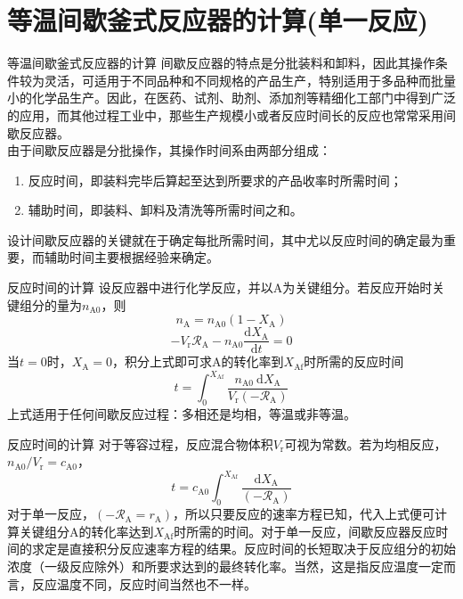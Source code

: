\section{等温间歇釜式反应器的计算(单一反应)}


\begin{frame}{等温间歇釜式反应器的计算}
    \qquad 间歇反应器的特点是分批装料和卸料，因此其操作条件较为灵活，可适用于不同品种和不同规格的产品生产，特别适用于多品种而批量小的化学品生产。因此，在医药、试剂、助剂、添加剂等精细化工部门中得到广泛的应用，而其他过程工业中，那些生产规模小或者反应时间长的反应也常常采用间歇反应器。
    \\\qquad 由于间歇反应器是分批操作，其操作时间系由两部分组成：
    \begin{enumerate}
      \item 反应时间，即装料完毕后算起至达到所要求的产品收率时所需时间；
      \item 辅助时间，即装料、卸料及清洗等所需时间之和。
    \end{enumerate}
    设计间歇反应器的关键就在于确定每批所需时间，其中尤以反应时间的确定最为重要，而辅助时间主要根据经验来确定。
\end{frame}


\begin{frame}{反应时间的计算}      
    设反应器中进行化学反应，并以A为关键组分。若反应开始时关键组分的量为$n_\mathrm{A0}$，则
    $$n_{\mathrm{A}}=n_{\mathrm{A} 0}(1-X_{\mathrm{A}})$$
    $$-V_{\mathrm{r}} \mathscr{R}_{\mathrm{A}}-n_{\mathrm{A} 0} \frac{\mathrm{d} X_{\mathrm{A}}}{\mathrm{d} t}=0$$        
    当$t=0$时，$X_\mathrm{A}=0$，积分上式即可求A的转化率到$X_\mathrm{Af}$时所需的反应时间
    $$t=\int_{0}^{X_{\mathrm{Af}}} \frac{n_{\mathrm{A} 0} \mathrm{~d} X_{\mathrm{A}}}{V_{\mathrm{r}}(-\mathscr{R}_{\mathrm{A}})}$$
    上式适用于任何间歇反应过程：多相还是均相，等温或非等温。
\end{frame}


\begin{frame}{反应时间的计算}      
    对于等容过程，反应混合物体积$V_\mathrm{r}$可视为常数。若为均相反应，$n_{\mathrm{A0}}/V_\mathrm{r}=c_{\mathrm{A0}}$，
    $$t=c_{\mathrm{A} 0} \int_{0}^{X_{\mathrm{Af}}} \frac{\mathrm{d} X_{\mathrm{A}}}{(-\mathscr{R}_{\mathrm{A}})}$$
    对于单一反应，$(-\mathscr{R}_\mathrm{A}=r_\mathrm{A})$，所以只要反应的速率方程已知，代入上式便可计算关键组分A的转化率达到$X_\mathrm{Af}$时所需的时间。对于单一反应，间歇反应器反应时间的求定是直接积分反应速率方程的结果。反应时间的长短取决于反应组分的初始浓度（一级反应除外）和所要求达到的最终转化率。当然，这是指反应温度一定而言，反应温度不同，反应时间当然也不一样。
\end{frame}


